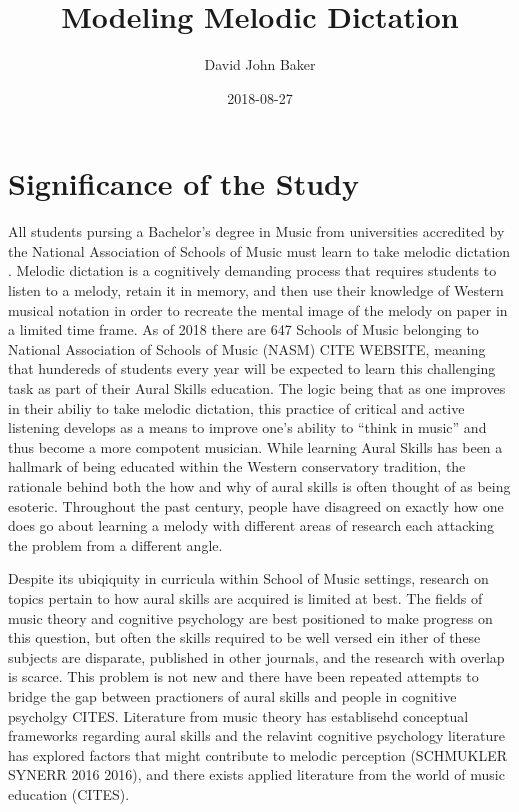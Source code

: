 \documentclass[]{book}
\title{Modeling Melodic Dictation}
\author{David John Baker}
\date{2018-08-27}
\theoremstyle{definition}
\theoremstyle{definition}
\theoremstyle{definition}
\theoremstyle{remark}
\begin{document}
\maketitle

{
\setcounter{tocdepth}{1}
\tableofcontents
}
\hypertarget{significance-of-the-study}{%
\chapter{Significance of the Study}\label{significance-of-the-study}}

All students pursing a Bachelor's degree in Music from universities
accredited by the National Association of Schools of Music must learn to
take melodic dictation \citep[ Section
VIII.6.B.2.A]{NationalAssociationSchools2018}. Melodic dictation is a
cognitively demanding process that requires students to listen to a
melody, retain it in memory, and then use their knowledge of Western
musical notation in order to recreate the mental image of the melody on
paper in a limited time frame. As of 2018 there are 647 Schools of Music
belonging to National Association of Schools of Music (NASM) CITE
WEBSITE, meaning that hundereds of students every year will be expected
to learn this challenging task as part of their Aural Skills education.
The logic being that as one improves in their abiliy to take melodic
dictation, this practice of critical and active listening develops as a
means to improve one's ability to ``think in music'' and thus become a
more compotent musician. While learning Aural Skills has been a hallmark
of being educated within the Western conservatory tradition, the
rationale behind both the how and why of aural skills is often thought
of as being esoteric. Throughout the past century, people have disagreed
on exactly how one does go about learning a melody with different areas
of research each attacking the problem from a different angle.

Despite its ubiqiquity in curricula within School of Music settings,
research on topics pertain to how aural skills are acquired is limited
at best. The fields of music theory and cognitive psychology are best
positioned to make progress on this question, but often the skills
required to be well versed ein ither of these subjects are disparate,
published in other journals, and the research with overlap is scarce.
This problem is not new and there have been repeated attempts to bridge
the gap between practioners of aural skills and people in cognitive
psycholgy CITES. Literature from music theory has establisehd conceptual
frameworks regarding aural skills
\citet{karpinskiAuralSkillsAcquisition2000} and the relavint cognitive
psychology literature has explored factors that might contribute to
melodic perception (SCHMUKLER SYNERR 2016 2016), and there exists
applied literature from the world of music education (CITES).
\end{document}
